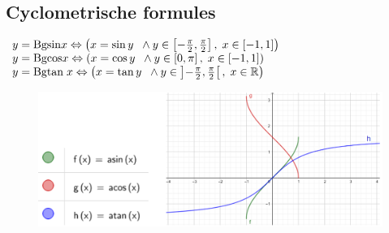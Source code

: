 \documentclass[a5paper]{article}
\begin{document}
\subsection{Cyclometrische formules}
$\begin{array}{*{20}{l}}
{y = {\mathop{\rm Bgsin}\nolimits} x \Leftrightarrow \left( {x = \sin y\;\; \wedge y \in \left[ { - \frac{\pi }{2},\frac{\pi }{2}} \right],\;x \in \left[ { - 1,1} \right]} \right)}\\
{y = {\mathop{\rm Bgcos}\nolimits} x \Leftrightarrow \left( {x = \cos y\;\; \wedge y \in \left[ {0,\pi } \right],\;x \in \left[ { - 1,1} \right]} \right)}\\
{y = {\mathop{\rm Bgtan}\nolimits} \;x \Leftrightarrow \left( {x = \tan y\;\; \wedge y \in \left] { - \frac{\pi }{2},\frac{\pi }{2}} \right[,\;x \in \mathbb {R} } \right)}
\end{array}$
\begin{figure}[h!]
    \centering
    \includegraphics[width=0.6\linewidth]{image_goniometrie_cyclof.png}
    \label{fig:enter-label}
\end{figure}
\end{document}
